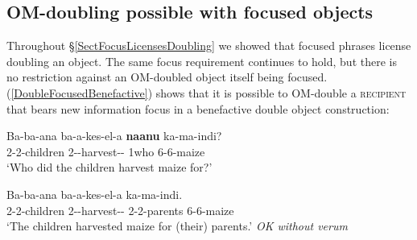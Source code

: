\documentclass[output=paper]{langscibook}
\begin{document}

\z 





\subsection{OM-doubling possible with focused objects}

Throughout \S \ref{SectFocusLicensesDoubling} we showed that focused phrases license doubling an object. The same focus requirement continues to hold, but there is no restriction against an OM-doubled object itself being focused. (\ref{DoubleFocusedBenefactive}) shows that it is possible to OM-double a \textsc{recipient} that bears new information focus in a benefactive double object construction:

\ea \label{DoubleFocusedBenefactive}
\begin{xlist}

\gll Ba-ba-ana ba-a-kes-el-a \textbf{naanu} ka-ma-indi? \\
2-2-children 2\Sm-\Pst-harvest-\Appl-\Fv{} 1who 6-6-maize \\
\glt `Who did the children harvest maize for?’ 

\gll Ba-ba-ana ba-a-kes-el-a  ka-ma-indi.\\
2-2-children 2\Sm-\Om-harvest-\Appl-\Fv{} 2-2-parents 6-6-maize\\
\glt `The children harvested maize for (their) parents.' \textit{OK without verum}
\end{xlist}
\z
\end{document}
